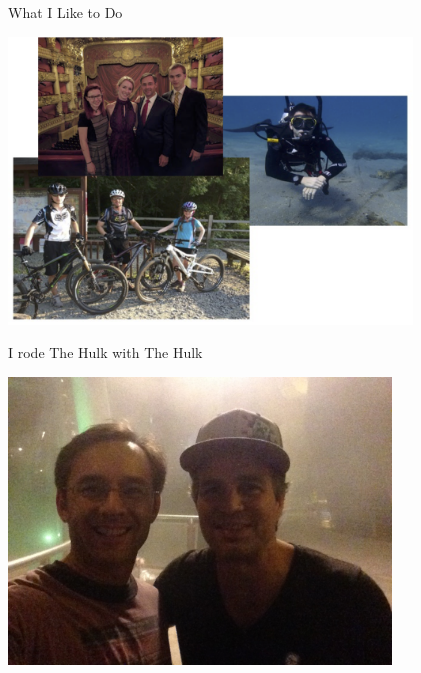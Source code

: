 \documentclass{beamer}
\begin{document}
\begin{frame}[fragile]{What I Like to Do}

\begin{center}
\includegraphics[height=3in]{chris-hobbies.png}
\end{center}


\end{frame}

\begin{frame}[fragile]{I rode The Hulk with The Hulk}

\begin{center}
\includegraphics[height=3in]{chris-hulk.jpg}
\end{center}

\end{frame}
\end{document}
